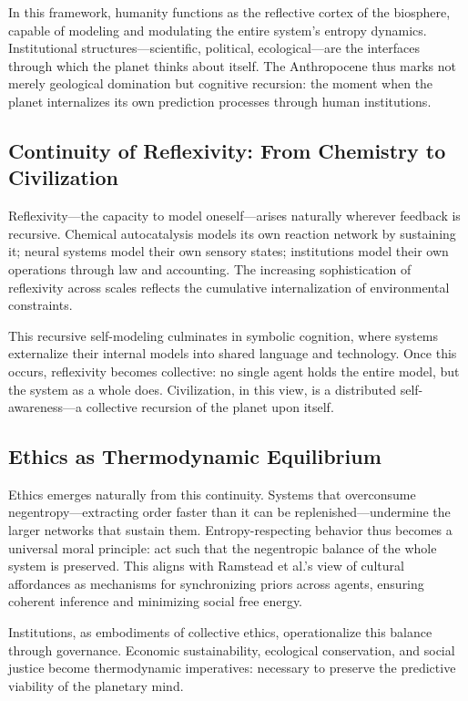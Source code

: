 \documentclass[11pt,a4paper]{article}
\begin{document}
In this framework, humanity functions as the reflective cortex of the biosphere, capable of modeling and modulating the entire system’s entropy dynamics.  Institutional structures—scientific, political, ecological—are the interfaces through which the planet thinks about itself.  The Anthropocene thus marks not merely geological domination but cognitive recursion: the moment when the planet internalizes its own prediction processes through human institutions.

\subsection{Continuity of Reflexivity: From Chemistry to Civilization}

Reflexivity—the capacity to model oneself—arises naturally wherever feedback is recursive.  Chemical autocatalysis models its own reaction network by sustaining it; neural systems model their own sensory states; institutions model their own operations through law and accounting.  The increasing sophistication of reflexivity across scales reflects the cumulative internalization of environmental constraints.

This recursive self-modeling culminates in symbolic cognition, where systems externalize their internal models into shared language and technology.  Once this occurs, reflexivity becomes collective: no single agent holds the entire model, but the system as a whole does.  Civilization, in this view, is a distributed self-awareness—a collective recursion of the planet upon itself.

\subsection{Ethics as Thermodynamic Equilibrium}

Ethics emerges naturally from this continuity.  Systems that overconsume negentropy—extracting order faster than it can be replenished—undermine the larger networks that sustain them.  Entropy-respecting behavior thus becomes a universal moral principle: act such that the negentropic balance of the whole system is preserved.  This aligns with Ramstead et al.’s \citep{Ramstead2016CulturalAffordances} view of cultural affordances as mechanisms for synchronizing priors across agents, ensuring coherent inference and minimizing social free energy.

Institutions, as embodiments of collective ethics, operationalize this balance through governance.  Economic sustainability, ecological conservation, and social justice become thermodynamic imperatives: necessary to preserve the predictive viability of the planetary mind.
\end{document}
